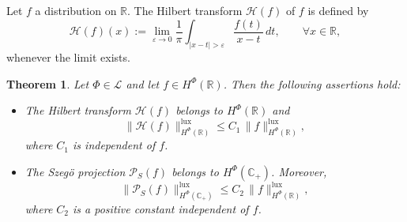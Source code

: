 \documentclass[a4paper,12pt,intlimits,oneside]{amsart}
\newtheorem{theorem}{Theorem}[section]
\theoremstyle{definition}
\numberwithin{equation}{section}
\theoremstyle{definition}
\begin{document}
Let $f$ a distribution on $\mathbb{R}$. The Hilbert transform $\mathcal{H}(f)$ of $f$ is defined by
\[
\mathcal{H}(f)(x)
:=
\lim_{\varepsilon\to 0}
\frac{1}{\pi}
\int_{|x-t|>\varepsilon}
\frac{f(t)}{x-t}\,dt,
\qquad \forall x\in\mathbb{R},
\]
whenever the limit exists.



\begin{theorem}\label{pro:main5aq5}
Let $\Phi \in \mathscr{L}$ and let $f \in H^{\Phi}(\mathbb{R})$. Then the following assertions hold:
\begin{itemize}
\item[(i)] The Hilbert transform $\mathcal{H}(f)$ belongs to $H^{\Phi}(\mathbb{R})$ and
\begin{equation}\label{eq:deaqaa2}
\|\mathcal{H}(f)\|_{H^{\Phi}(\mathbb{R})}^{\mathrm{lux}}
\leq C_{1}\,\|f\|_{H^{\Phi}(\mathbb{R})}^{\mathrm{lux}},
\end{equation}
where $C_{1}$ is independent of $f$.

\item[(ii)] The Szeg\"o projection $\mathcal{P}_{S}(f)$ belongs to $H^{\Phi}(\mathbb{C}_{+})$. Moreover,
\begin{equation}\label{eq:deaqaaqqa2}
\|\mathcal{P}_{S}(f)\|_{H^{\Phi}(\mathbb{C}_{+})}^{\mathrm{lux}}
\leq C_{2}\,\|f\|_{H^{\Phi}(\mathbb{R})}^{\mathrm{lux}},
\end{equation}
where $C_{2}$ is a positive constant independent of $f$.
\end{itemize}
\end{theorem}
\end{document}
